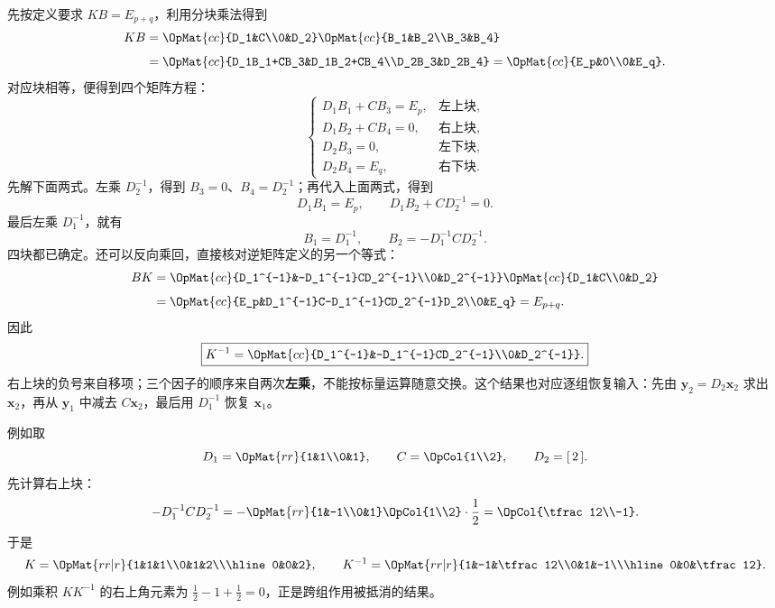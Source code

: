 \documentclass[a4paper,12pt,twoside,openany,fontset=none]{ctexbook}
\numberwithin{equation}{chapter}
\begin{document}
先按定义要求 $KB=E_{p+q}$，利用分块乘法得到
\[
 \begin{aligned}
 KB&=\OpMat{cc}{D_1&C\\0&D_2}\OpMat{cc}{B_1&B_2\\B_3&B_4}\\[4pt]
 &=\OpMat{cc}{D_1B_1+CB_3&D_1B_2+CB_4\\D_2B_3&D_2B_4}
 =\OpMat{cc}{E_p&0\\0&E_q}.
 \end{aligned}
\]
对应块相等，便得到四个矩阵方程：
\[
 \begin{cases}
 D_1B_1+CB_3=E_p, &\text{左上块},\\
 D_1B_2+CB_4=0,   &\text{右上块},\\
 D_2B_3=0,        &\text{左下块},\\
 D_2B_4=E_q,      &\text{右下块}.
 \end{cases}
\]
先解下面两式。左乘 $D_2^{-1}$，得到 $B_3=0$、$B_4=D_2^{-1}$；再代入上面两式，得到
\[
 D_1B_1=E_p,\qquad D_1B_2+CD_2^{-1}=0.
\]
最后左乘 $D_1^{-1}$，就有
\[
 B_1=D_1^{-1},\qquad B_2=-D_1^{-1}CD_2^{-1}.
\]
四块都已确定。还可以反向乘回，直接核对逆矩阵定义的另一个等式：
\[
 \begin{aligned}
 BK&=\OpMat{cc}{D_1^{-1}&-D_1^{-1}CD_2^{-1}\\0&D_2^{-1}}
       \OpMat{cc}{D_1&C\\0&D_2}\\[4pt]
   &=\OpMat{cc}{E_p&D_1^{-1}C-D_1^{-1}CD_2^{-1}D_2\\0&E_q}
   =E_{p+q}.
 \end{aligned}
\]
因此
\[
 \boxed{K^{-1}=\OpMat{cc}{D_1^{-1}&-D_1^{-1}CD_2^{-1}\\0&D_2^{-1}}.}
\]
右上块的负号来自移项；三个因子的顺序来自两次\textbf{左乘}，不能按标量运算随意交换。这个结果也对应逐组恢复输入：先由 $\boldsymbol y_2=D_2\boldsymbol x_2$ 求出 $\boldsymbol x_2$，再从 $\boldsymbol y_1$ 中减去 $C\boldsymbol x_2$，最后用 $D_1^{-1}$ 恢复 $\boldsymbol x_1$。

例如取
\[
 D_1=\OpMat{rr}{1&1\\0&1},\qquad C=\OpCol{1\\2},\qquad D_2=[\,2\,].
\]
先计算右上块：
\[
 -D_1^{-1}CD_2^{-1}
 =-\OpMat{rr}{1&-1\\0&1}\OpCol{1\\2}\cdot\frac12
 =\OpCol{\tfrac12\\-1}.
\]
于是
\[
 K=\OpMat{rr|r}{1&1&1\\0&1&2\\\hline0&0&2},\qquad
 K^{-1}=\OpMat{rr|r}{1&-1&\tfrac12\\0&1&-1\\\hline0&0&\tfrac12}.
\]
例如乘积 $KK^{-1}$ 的右上角元素为 $\tfrac12-1+\tfrac12=0$，正是跨组作用被抵消的结果。
\end{document}
